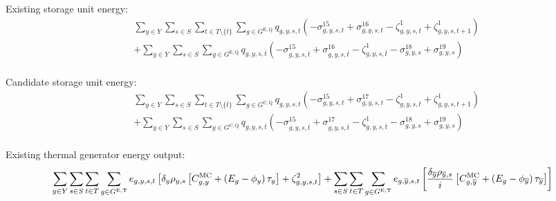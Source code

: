 \documentclass{article}
\newcommand{\sGeneratorsExistingThermal}{G^{\mathrm{E,T}}}
\newcommand{\sStorageExisting}{G^{\mathrm{E,Q}}}
\newcommand{\sStorageCandidate}{G^{\mathrm{C,Q}}}
\newcommand{\sYears}{Y}
\newcommand{\sScenarios}{S}
\newcommand{\sIntervals}{T}
\newcommand{\iGenerator}{g}
\newcommand{\iYear}{y}
\newcommand{\iYearTerminal}{\overline{\iYear}}
\newcommand{\iScenario}{s}
\newcommand{\iInterval}{t}
\newcommand{\iIntervalTerminal}{\overline{\iInterval}}
\newcommand{\cScenarioDuration}[1][\iYear,\iScenario]{\rho_{#1}}
\newcommand{\cMarginalCost}[1][\iGenerator,\iYear]{C^{\mathrm{MC}}_{#1}}
\newcommand{\cEmissionsIntensity}[1][\iGenerator]{E_{#1}}
\newcommand{\cInterestRate}{i}
\newcommand{\cDiscountRate}[1][\iYear]{\delta_{#1}}
\newcommand{\vBaseline}[1][\iYear]{\phi_{#1}}
\newcommand{\vPermitPrice}[1][\iYear]{\tau_{#1}}
\newcommand{\vEnergy}[1][\iGenerator,\iYear,\iScenario,\iInterval]{e_{#1}}
\newcommand{\vStorageUnitEnergy}[1][\iGenerator,\iYear,\iScenario,\iInterval]{q_{#1}}
\newcommand{\dNonNegativeStorageEnergy}[1][\iGenerator,\iYear,\iScenario,\iInterval]{\sigma_{#1}^{15}}
\newcommand{\dMaxStorageEnergyExisting}[1][\iGenerator,\iYear,\iScenario,\iInterval]{\sigma_{#1}^{16}}
\newcommand{\dMaxStorageEnergyCandidate}[1][\iGenerator,\iYear,\iScenario,\iInterval]{\sigma_{#1}^{17}}
\newcommand{\dMinStorageEnergyIntervalEnd}[1][\iGenerator,\iYear,\iScenario]{\sigma_{#1}^{18}}
\newcommand{\dMaxStorageEnergyIntervalEnd}[1][\iGenerator,\iYear,\iScenario]{\sigma_{#1}^{19}}
\newcommand{\dStorageEnergyTransition}[1][\iGenerator,\iYear,\iScenario,\iInterval]{\zeta_{#1}^{1}}
\newcommand{\dGeneratorEnergyOutput}[1][\iGenerator,\iYear,\iScenario,\iInterval]{\zeta_{#1}^{2}}
\begin{document}
Existing storage unit energy:
\begin{align}
	& \sum\limits_{\iYear \in \sYears}\sum\limits_{\iScenario \in \sScenarios} \sum\limits_{\iInterval \in \sIntervals \setminus \{\iIntervalTerminal\}} \sum\limits_{\iGenerator \in \sStorageExisting} \vStorageUnitEnergy \left(- \dNonNegativeStorageEnergy + \dMaxStorageEnergyExisting - \dStorageEnergyTransition + \dStorageEnergyTransition[\iGenerator,\iYear,\iScenario,\iInterval+1] \right)\\
	& + \sum\limits_{\iYear \in \sYears}\sum\limits_{\iScenario \in \sScenarios}\sum\limits_{\iGenerator \in \sStorageExisting} \vStorageUnitEnergy[\iGenerator,\iYear,\iScenario,\iIntervalTerminal] \left(- \dNonNegativeStorageEnergy[\iGenerator,\iYear,\iScenario,\iIntervalTerminal] + \dMaxStorageEnergyExisting[\iGenerator,\iYear,\iScenario,\iIntervalTerminal] - \dStorageEnergyTransition[\iGenerator,\iYear,\iScenario,\iIntervalTerminal] - \dMinStorageEnergyIntervalEnd + \dMaxStorageEnergyIntervalEnd \right)\\
\end{align}

Candidate storage unit energy:
\begin{align}
	& \sum\limits_{\iYear \in \sYears}\sum\limits_{\iScenario \in \sScenarios} \sum\limits_{\iInterval \in \sIntervals \setminus \{\iIntervalTerminal\}} \sum\limits_{\iGenerator \in \sStorageCandidate} \vStorageUnitEnergy \left(- \dNonNegativeStorageEnergy + \dMaxStorageEnergyCandidate - \dStorageEnergyTransition + \dStorageEnergyTransition[\iGenerator,\iYear,\iScenario,\iInterval+1] \right)\\
	& + \sum\limits_{\iYear \in \sYears}\sum\limits_{\iScenario \in \sScenarios}\sum\limits_{\iGenerator \in \sStorageCandidate} \vStorageUnitEnergy[\iGenerator,\iYear,\iScenario,\iIntervalTerminal] \left(- \dNonNegativeStorageEnergy[\iGenerator,\iYear,\iScenario,\iIntervalTerminal] + \dMaxStorageEnergyCandidate[\iGenerator,\iYear,\iScenario,\iIntervalTerminal] - \dStorageEnergyTransition[\iGenerator,\iYear,\iScenario,\iIntervalTerminal] - \dMinStorageEnergyIntervalEnd + \dMaxStorageEnergyIntervalEnd \right)\\
\end{align}

Existing thermal generator energy output:
\begin{equation}
	\sumIntervals \sum\limits_{\iGenerator \in \sGeneratorsExistingThermal} \vEnergy \left[\cDiscountRate \cScenarioDuration \left[\cMarginalCost + \left(\cEmissionsIntensity - \vBaseline\right)\vPermitPrice \right]  + \dGeneratorEnergyOutput\right] + \sum\limits_{\iScenario \in \sScenarios} \sum\limits_{\iInterval \in \sIntervals} \sum\limits_{\iGenerator \in \sGeneratorsExistingThermal} \vEnergy[\iGenerator,\iYearTerminal,\iScenario,\iInterval] \left[ \frac{\cDiscountRate[\iYearTerminal] \cScenarioDuration[\iYearTerminal,\iScenario]}{\cInterestRate} \left[\cMarginalCost[\iGenerator,\iYearTerminal] + \left(\cEmissionsIntensity - \vBaseline[\iYearTerminal]\right)\vPermitPrice[\iYearTerminal] \right]\right]
\end{equation}
\end{document}
